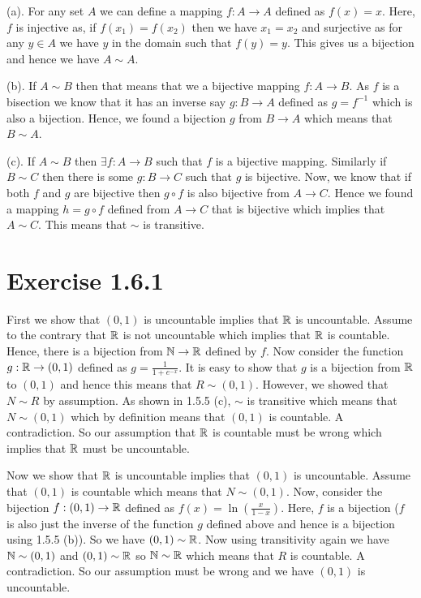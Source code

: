 \documentclass[a4paper]{report}
\begin{document}
(a). For any set $A$ we can define a mapping $f: A \to A$ defined as  $f(x) = x$.  Here, $f$ is injective as, if $f(x_1) = f(x_2) $ then we have $x_1 = x_2$ and surjective as for any  $y \in A$ we have $y$ in the domain such that $f(y) = y$. This gives us a bijection and hence we have $A \sim A$.
\vspace{1em}


(b). If $A \sim B$ then that means that we a bijective mapping  $f: A \to B$. As $f$ is a bisection we know that it has an inverse say $g: B \to A$  defined as $g = f^{-1}$ which is also a bijection. Hence, we found a bijection $g$ from $B \to A$ which means that  $B \sim A$.

\vspace{1em}


(c). If $A \sim B$ then $\exists f : A \to B$ such that $f$ is a bijective mapping. Similarly if $B \sim C$ then there is some  $g : B \to C$ such that  $g$ is bijective. Now, we know that if both $f$ and $g$ are bijective then $g \circ f$ is also bijective from  $A \to C$. Hence we found a mapping  $h = g \circ f$  defined from  $A \to C$ that is bijective which implies that  $A \sim C$. This means that  $\sim$ is transitive.
\section*{Exercise 1.6.1}
First we show that $(0, 1)$ is uncountable implies that  $\mathbb{R}$ is uncountable. Assume to the contrary that $\mathbb{R}$ is not uncountable which implies that $\mathbb{R}$ is countable. Hence, there is a bijection from $\mathbb{N} \to \mathbb{R}$ defined  by $f$. Now consider the function  $g: \mathbb{R} \to (0, 1)$ defined as  $g = \frac{1}{1 + e^{-x}}$. It is easy to show that $g$ is a bijection from $\mathbb{R}$ to $(0, 1)$ and hence this means that  $R \sim (0, 1)$. However, we showed that  $N \sim R$ by assumption.  As shown in 1.5.5 (c), $\sim$ is transitive which means that  $N \sim (0, 1)$ which by definition means that  $(0, 1)$ is countable. A contradiction. So our assumption that $\mathbb{R}$ is countable must be wrong which implies that $\mathbb{R}$ must be uncountable.

\vspace{1em}

Now we show that $\mathbb{R}$ is uncountable implies that $(0, 1)$ is uncountable. Assume that $(0, 1)$ is countable which means that $N \sim (0, 1)$. Now, consider the bijection  $f: (0, 1) \to \mathbb{R}$ defined as $f(x) = \ln(\frac{x}{1 - x})$. Here, $f$ is a bijection ($f$ is also just the inverse of the function $g$ defined above and hence is a bijection using 1.5.5 (b)). So we have $(0, 1) \sim \mathbb{R}$. Now using transitivity again we have  $\mathbb{N} \sim (0, 1)$ and  $(0, 1) \sim \mathbb{R}$ so  $\mathbb{N} \sim \mathbb{R}$ which means that $R$ is countable. A  contradiction. So our assumption must be wrong and we have $(0, 1)$ is uncountable. 
\end{document}
